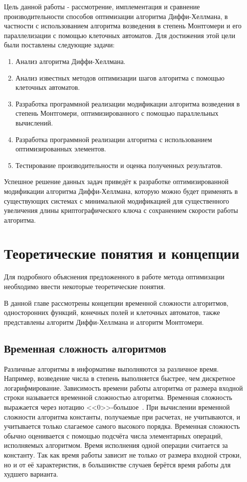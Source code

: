 \documentclass[times,specification,annotation]{itmo-student-thesis}
\begin{document}
Цель данной работы - рассмотрение, имплементация и сравнение производительности способов оптимизации алгоритма
Диффи-Хеллмана, в частности с использованием алгоритма возведения в степень Монтгомери и его параллелизации
с помощью клеточных автоматов.
Для достижения этой цели были поставлены следующие задачи:
\begin{enumerate}[label=\arabic*.]
    \item Анализ алгоритма Диффи-Хеллмана.
    \item Анализ известных методов оптимизации шагов алгоритма с помощью клеточных автоматов.
    \item Разработка программной реализации модификации алгоритма возведения в степень Монтгомери, оптимизированного с помощью параллельных вычислений.
    \item Разработка программной реализации алгоритма с использованием оптимизированных элементов.
    \item Тестирование производительности и оценка полученных результатов.
\end{enumerate}
Успешное решение данных задач приведёт к разработке оптимизированной модификации алгоритма Диффи-Хеллмана,
которую можно будет применять в существующих системах с минимальной модификацией для существенного увеличения длины
криптографического ключа с сохранением скорости работы алгоритма.


\chapter{Теоретические понятия и концепции}

\startrelatedwork
Для подробного объяснения предложенного в работе метода оптимизации необходимо ввести некоторые теоретические понятия.

В данной главе рассмотрены концепции временной сложности алгоритмов, односторонних функций, конечных полей и клеточных автоматов,
также представлены алгоритм Диффи-Хеллмана и алгоритм Монтгомери.

\section{Временная сложность алгоритмов}\label{sec:asympt}

Различные алгоритмы в информатике выполняются за различное время.
Например, возведение числа в степень выполняется быстрее, чем дискретное логарифмирование.
Зависимость времени работы алгоритма от размера входной строки называется временной сложностью алгоритма.
Временная сложность выражается через нотацию <<$\textit{0}$>>-большое~\cite{knu97}.
При вычислении временной сложности алгоритма константы, получаемые при расчетах, не учитываются, и учитывается только слагаемое самого высокого порядка.
Временная сложность обычно оценивается с помощью подсчёта числа элементарных операций, исполняемых алгоритмом.
Время исполнения одной операции считается за константу.
Так как время работы зависит не только от размера входной строки, но и от её характеристик,
в большинстве случаев берётся время работы для худшего варианта.
\end{document}
